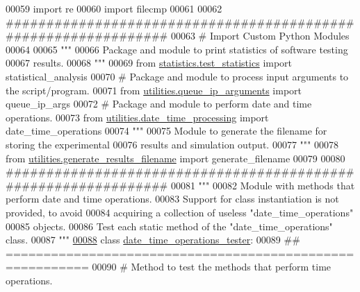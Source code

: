 \begin{DoxyCode}
00059 \textcolor{keyword}{import} re
00060 \textcolor{keyword}{import} filecmp
00061 
00062 \textcolor{comment}{###############################################################}
00063 \textcolor{comment}{#   Import Custom Python Modules}
00064 
00065 \textcolor{stringliteral}{"""}
00066 \textcolor{stringliteral}{    Package and module to print statistics of software testing}
00067 \textcolor{stringliteral}{        results.}
00068 \textcolor{stringliteral}{"""}
00069 \textcolor{keyword}{from} \hyperlink{namespacestatistics_1_1test__statistics}{statistics.test\_statistics} \textcolor{keyword}{import} statistical\_analysis
00070 \textcolor{comment}{# Package and module to process input arguments to the script/program.}
00071 \textcolor{keyword}{from} \hyperlink{namespaceutilities_1_1queue__ip__arguments}{utilities.queue\_ip\_arguments} \textcolor{keyword}{import} queue\_ip\_args
00072 \textcolor{comment}{# Package and module to perform date and time operations.}
00073 \textcolor{keyword}{from} \hyperlink{namespaceutilities_1_1date__time__processing}{utilities.date\_time\_processing} \textcolor{keyword}{import} date\_time\_operations
00074 \textcolor{stringliteral}{"""}
00075 \textcolor{stringliteral}{    Module to generate the filename for storing the experimental}
00076 \textcolor{stringliteral}{        results and simulation output.}
00077 \textcolor{stringliteral}{"""}
00078 \textcolor{keyword}{from} \hyperlink{namespaceutilities_1_1generate__results__filename}{utilities.generate\_results\_filename} \textcolor{keyword}{import} generate\_filename
00079 
00080 \textcolor{comment}{###############################################################}
00081 \textcolor{stringliteral}{"""}
00082 \textcolor{stringliteral}{    Module with methods that perform date and time operations.}
00083 \textcolor{stringliteral}{    Support for class instantiation is not provided, to avoid}
00084 \textcolor{stringliteral}{        acquiring a collection of useless "date\_time\_operations"}
00085 \textcolor{stringliteral}{        objects.}
00086 \textcolor{stringliteral}{    Test each static method of the "date\_time\_operations" class.}
00087 \textcolor{stringliteral}{"""}
\hypertarget{date__time__processing__tester_8py_source_l00088}{}\hyperlink{classutilities_1_1date__time__processing__tester_1_1date__time__operations__tester}{00088} \textcolor{keyword}{class }\hyperlink{classutilities_1_1date__time__processing__tester_1_1date__time__operations__tester}{date\_time\_operations\_tester}:
00089     \textcolor{comment}{## =========================================================}
00090     \textcolor{comment}{#   Method to test the methods that perform time operations.}

\end{DoxyCode}
